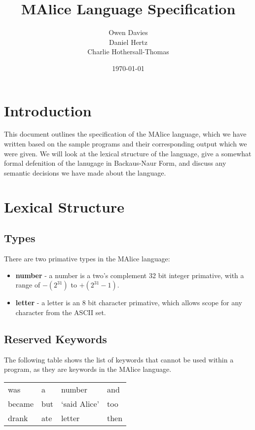 \documentclass[a4, 11pt]{article}
\begin{document}
\title{\huge{MAlice Language Specification}}
\author{Owen Davies\\Daniel Hertz\\Charlie Hothersall-Thomas}
\date{\today}

\maketitle

\section*{Introduction}
This document outlines the specification of the MAlice language, which we have 
written based on the sample programs and their corresponding output which we 
were given. We will look at the lexical structure of the language, give a 
somewhat formal defenition of the lanugage in Backaus-Naur Form, and discuss 
any semantic decisions we have made about the language.

\section*{Lexical Structure}
\subsection*{Types}
There are two primative types in the MAlice language:

\begin{itemize}
  \item \textbf{number} - a number is a two's complement 32 bit integer 
  primative, with a range of \( -(2^{31}) \) to \( +(2^{31} - 1) \). 
  \item \textbf{letter} - a letter is an 8 bit character primative, which 
  allows scope for any character from the ASCII set.
\end{itemize}

\subsection*{Reserved Keywords}
The following table shows the list of keywords that cannot be used within a 
program, as they are keywords in the MAlice language.

\begin{center}
  \begin{tabular}{l l l l}
  was    & a   & number                                   & and \\
  became & but & \textquoteleft said Alice\textquoteright & too \\
  drank  & ate & letter                                   & then \\
  \end{tabular}
\end{center}
\end{document}

